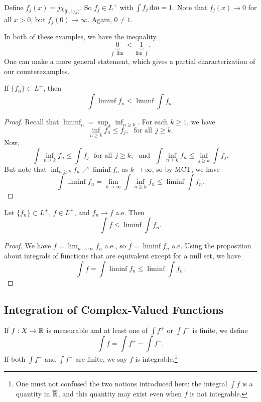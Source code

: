 \documentclass[12pt]{article} %
\begin{document}
\begin{example}
    Define $f_j(x) = j \chi_{[0, 1/j)}$. So $f_j \in L^+$ with $\int f_j \, \mathrm{d} m = 1$. Note that $f_j(x) \to 0$ for all $x > 0$, but $f_j(0) \to \infty$. Again, $0 \neq 1$. 
\end{example}

\noindent In both of these examples, we have the inequality \[\underbrace{0}_{\int \lim} < \underbrace{1}_{\lim \int}.\] One can make a more general statement, which gives a partial characterization of our counterexamples.

\begin{lemma}[Fatou]
    If $\{f_n\} \subset L^+$, then \[\int \liminf f_n \leq \liminf \int f_n.\]
\end{lemma}

\begin{proof}
    Recall that $\liminf_n = \sup_k \inf_{n \geq k}$. For each $k \geq 1$, we have \[\inf_{n \geq k} f_n \leq f_j, \ \ \ \text{for all} \ \ j \geq k.\] Now, \[\int \inf_{n \geq k} f_n \leq \int f_j \ \ \ \text{for all} \ \ j \geq k, \ \ \ \text{and} \ \ \ \int \inf_{n \geq k} f_n \leq \inf_{j \geq k} \int f_j.\] But note that $\inf_{n \geq k} f_n \nearrow \liminf f_n$ as $k \to \infty$, so by MCT, we have \[\int \liminf f_n = \lim_{k \to \infty} \int \inf_{n \geq k} f_n \leq \liminf \int f_n.\]
\end{proof}

\begin{corollary}
    Let $\{f_n\} \subset L^+$, $f \in L^+$, and $f_n \to f$ a.e. Then \[\int f \leq \liminf \int f_n.\]
\end{corollary}

\begin{proof}
    We have $f = \lim_{n \to \infty} f_n$ a.e., so $f = \liminf f_n$ a.e. Using the proposition about integrals of functions that are equivalent except for a null set, we have \[\int f = \int \liminf f_n \leq \liminf \int f_n.\]
\end{proof}

\subsection{Integration of Complex-Valued Functions}

\begin{definition}
    If $f : X \to \mathbb{R}$ is measurable and at least one of $\int f^+$ or $\int f^-$ is finite, we define \[\int f = \int f^+ - \int f^-.\] If both $\int f^+$ and $\int f^-$ are finite, we say $f$ is integrable.\footnote{One must not confused the two notions introduced here: the integral $\int f$ is a quantity in $\overline{\mathbb{R}}$, and this quantity may exist even when $f$ is not integrable.}
\end{definition}
\end{document}
